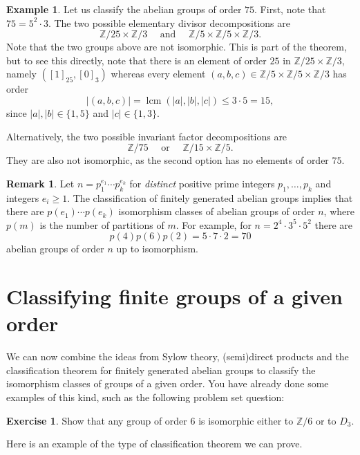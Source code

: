 \documentclass[12pt]{report}
\numberwithin{equation}{section}
\numberwithin{theorem}{chapter}
\theoremstyle{definition}
\newtheorem{example}[theorem]{Example}
\newtheorem{exercise}{Exercise}
\newtheorem*{basic properties}{Basic Properties}
\newtheorem*{Important Remark}{Important Remark}
\newtheorem{remark}[theorem]{Remark}
\newcommand{\Z}{\mathbb{Z}}
\DeclareMathOperator{\lcm}{lcm}
\begin{document}
\begin{example}
Let us classify the abelian groups of order $75$. First, note that $75 = 5^2 \cdot 3$. The two possible elementary divisor decompositions are 
$$\Z/25 \times \Z/3 \quad \text{ and } \quad \Z/5 \times \Z/5 \times \Z/3.$$
Note that the two groups above are not isomorphic. This is part of the theorem, but to see this directly, note that there is an element of order $25$ in $\Z/25 \times \Z/3$, namely $([1]_{25},[0]_3)$ whereas every element $(a,b,c)\in \Z/5 \times \Z/5 \times \Z/3$ has order 
$$|(a,b,c)| =\lcm(|a|, |b|, |c|)\leqslant 3 \cdot 5 = 15,$$
since $|a|, |b| \in \{1,5\}$ and $|c| \in \{1,3\}$.

Alternatively, the two possible invariant factor decompositions are
$$\Z/75 \quad \text{ or } \quad \Z/15 \times \Z/5.$$
They are also not isomorphic, as the second option has no elements of order $75$.
\end{example}



\begin{remark} 
Let $n = p_1^{e_1} \cdots p_k^{e_k}$ for {\em distinct} positive prime integers $p_1, \dots, p_k$ and integers $e_i \geqslant 1$. The classification of finitely generated abelian groups implies that there are $p(e_1) \cdots p(e_k)$ isomorphism classes of abelian groups of order $n$, where $p(m)$ is the number of partitions of $m$. For example, for $n = 2^4 \cdot 3^5 \cdot 5^2$ there are 
$$p(4) p(6) p(2) = 5 \cdot 7 \cdot 2 = 70$$ 
abelian groups of order $n$ up to isomorphism.	
\end{remark}



\section{Classifying finite groups of a given order}

We can now combine the ideas from Sylow theory, (semi)direct products and the classification theorem for finitely generated abelian groups to classify the isomorphism classes of groups of a given order.
You have already done some examples of this kind, such as the following problem set question:

\begin{exercise}
Show that any group of order $6$ is isomorphic either to $\Z/6$ or to $D_3$.
\end{exercise}


Here is an example of the type of classification theorem we can prove.
\end{document}
